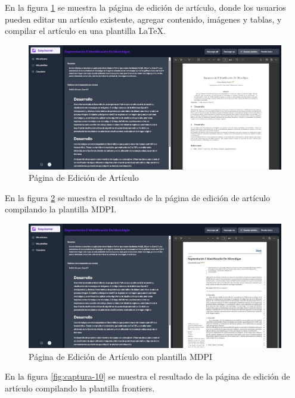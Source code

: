 En la figura \ref{fig:captura-8} se muestra la página de edición de artículo, donde los usuarios pueden editar un artículo existente, agregar contenido, imágenes y tablas, y compilar el artículo en una plantilla LaTeX.

\begin{figure}[H]
    \centering
    \includegraphics[width=1\textwidth]{IMAGENES/captura-8.png}
    \caption{Página de Edición de Artículo}
    \label{fig:captura-8}
\end{figure}

En la figura \ref{fig:captura-9} se muestra el resultado de la página de edición de artículo compilando la plantilla MDPI.

\begin{figure}[H]
    \centering
    \includegraphics[width=1\textwidth]{IMAGENES/captura-9.png}
    \caption{Página de Edición de Artículo con plantilla MDPI}
    \label{fig:captura-9}
\end{figure}

En la figura \ref{fig:captura-10} se muestra el resultado de la página de edición de artículo compilando la plantilla frontiers.

